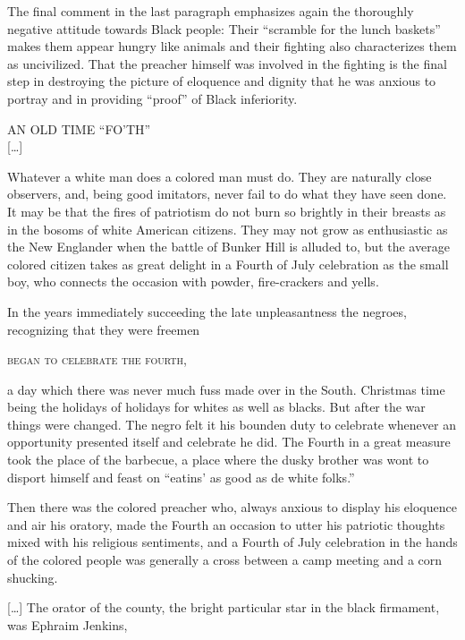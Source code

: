 The final comment in the last paragraph emphasizes again the thoroughly negative attitude towards Black people: Their “scramble for the lunch baskets” makes them appear hungry like animals and their fighting also characterizes them as uncivilized. That the preacher himself was involved in the fighting is the final step in destroying the picture of eloquence and dignity that he was anxious to portray and in providing “proof” of Black inferiority.

\begin{ipquote}
\begin{center}
AN OLD TIME “FO’TH”\\
{[…]}
\end{center}

Whatever a white man do{\kern0pt}es a colored man must do. They are naturally close observers, and, being good imitators, never fail to do what they have seen done. It may be that the fires of patriotism do not burn so brightly in their breasts as in the bosoms of white American citizens. They may not grow as enthusiastic as the New Englander when the battle of Bunker Hill is alluded to, but the average colored citizen takes as great delight in a Fourth of July celebration as the small boy, who connects the occasion with powder, fire-crackers and yells.

{In the years immediately succeeding the late unpleasantness the negro{\kern0pt}es, recognizing that they were freemen

\centering
\textsc{began to celebrate the fourth,}

a day which there was never much fuss made over in the South. Christmas time being the holidays of holidays for whites as well as blacks. But after the war things were changed. The negro felt it his bounden duty to celebrate whenever an opportunity presented itself and celebrate he did. The Fourth in a great measure took the place of the barbecue, a place where the dusky brother was wont to disport himself and feast on “eatins’ as good as de white folks.”}

Then there was the colored preacher who, always anxious to display his eloquence and air his oratory, made the Fourth an occasion to utter his patriotic thoughts mixed with his religious sentiments, and a Fourth of July celebration in the hands of the colored people was generally a cross between a camp meeting and a corn shucking.

{[…] The orator of the county, the bright particular star in the black firmament, was Ephraim Jenkins,

}
\end{ipquote}
